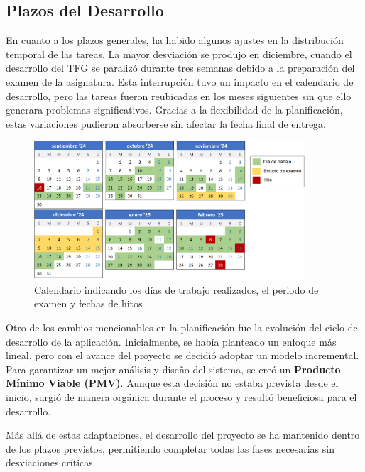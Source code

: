 \newpage

\subsection{Plazos del Desarrollo}

En cuanto a los plazos generales, ha habido algunos ajustes en la distribución temporal de las tareas. La mayor desviación se produjo en diciembre, cuando el desarrollo del TFG se paralizó durante tres semanas debido a la preparación del examen de la asignatura. Esta interrupción tuvo un impacto en el calendario de desarrollo, pero las tareas fueron reubicadas en los meses siguientes sin que ello generara problemas significativos. Gracias a la flexibilidad de la planificación, estas variaciones pudieron absorberse sin afectar la fecha final de entrega.

\begin{figure}[H]
    \centering
    \includegraphics[width=0.9\textwidth]{figures/syc/calendario_trabajo.png}
    \vspace{0.5cm}
    \caption{Calendario indicando los días de trabajo realizados, el periodo de examen y fechas de hitos}
    \label{tab:calendario_trabajo}
\end{figure}


Otro de los cambios mencionables en la planificación fue la evolución del ciclo de desarrollo de la aplicación. Inicialmente, se había planteado un enfoque más lineal, pero con el avance del proyecto se decidió adoptar un modelo incremental. Para garantizar un mejor análisis y diseño del sistema, se creó un \textbf{Producto Mínimo Viable (PMV)}. Aunque esta decisión no estaba prevista desde el inicio, surgió de manera orgánica durante el proceso y resultó beneficiosa para el desarrollo.

Más allá de estas adaptaciones, el desarrollo del proyecto se ha mantenido dentro de los plazos previstos, permitiendo completar todas las fases necesarias sin desviaciones críticas.

